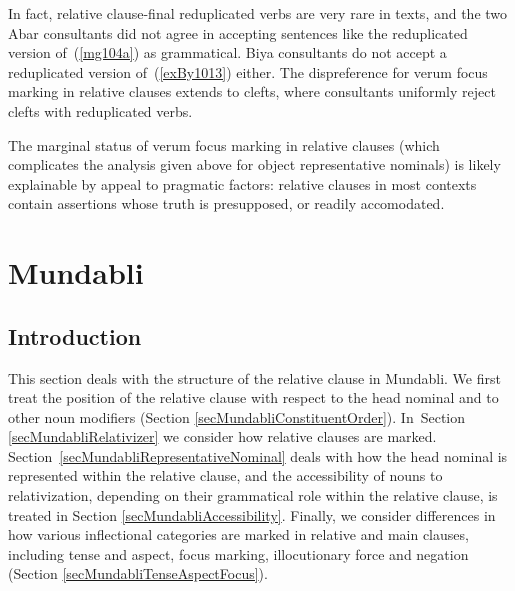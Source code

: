 \documentclass[10pt,twoside]{article}
\newcommand{\pref}[1]{(\ref{#1})}
\newcommand{\sref}[1]{Section \ref{#1}}
\begin{document}
In fact, relative clause-final reduplicated
verbs are very rare in texts, and the two Abar consultants 
did not agree in accepting sentences like the reduplicated version of~\pref{mg104a}
as grammatical. Biya consultants do not accept a reduplicated version
of~\pref{exBy1013} either.
The dispreference for verum focus marking in relative
clauses extends to clefts, where consultants uniformly reject clefts
with reduplicated verbs. 

The marginal status of verum focus marking in
relative clauses (which complicates the analysis given above for object
representative nominals) is likely explainable by appeal to pragmatic factors:
relative clauses in most contexts contain assertions whose truth
is presupposed, or readily accomodated. 
%
%

\section{Mundabli}\label{secMundabli}


\subsection{Introduction}\label{secMundabliIntro}

This section deals with the structure of the relative clause in Mundabli. We first treat the position of 
the relative clause with respect to the head nominal and to other noun modifiers 
(\sref{secMundabliConstituentOrder}). In~\sref{secMundabliRelativizer} we consider
how relative clauses are marked. Section~\ref{secMundabliRepresentativeNominal} deals with
how the head nominal is represented within 
the relative clause, and the accessibility of nouns to relativization, depending on their grammatical 
role within the relative clause, is treated in \sref{secMundabliAccessibility}. 
Finally, we consider differences in how various inflectional categories
are marked in relative and main clauses, including 
tense and aspect, focus marking, illocutionary force and negation (\sref{secMundabliTenseAspectFocus}).
\end{document}

